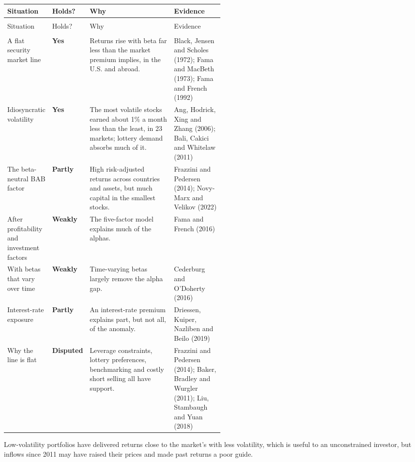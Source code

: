 {\small
\begin{longtable}{@{}>{\raggedright\arraybackslash}p{0.19\linewidth}>{\raggedright\arraybackslash}p{0.10\linewidth}>{\raggedright\arraybackslash}p{}>{\raggedright\arraybackslash}p{0.23\linewidth}@{}}
\toprule
Situation & Holds? & Why & Evidence \\
\midrule
\endfirsthead
\multicolumn{4}{@{}l}{\emph{(continued)}} \\
\toprule
Situation & Holds? & Why & Evidence \\
\midrule
\endhead
\midrule
\multicolumn{4}{r@{}}{\emph{(continued on the next page)}} \\
\endfoot
\bottomrule
\endlastfoot
A flat security market line & \textbf{Yes} & Returns rise with beta far less than the market premium implies, in the U.S. and abroad. & Black, Jensen and Scholes (1972); Fama and MacBeth (1973); Fama and French (1992) \\
\addlinespace[3pt]
Idiosyncratic volatility & \textbf{Yes} & The most volatile stocks earned about 1\% a month less than the least, in 23 markets; lottery demand absorbs much of it. & Ang, Hodrick, Xing and Zhang (2006); Bali, Cakici and Whitelaw (2011) \\
\addlinespace[3pt]
The beta-neutral BAB factor & \textbf{Partly} & High risk-adjusted returns across countries and assets, but much capital in the smallest stocks. & Frazzini and Pedersen (2014); Novy-Marx and Velikov (2022) \\
\addlinespace[3pt]
After profitability and investment factors & \textbf{Weakly} & The five-factor model explains much of the alphas. & Fama and French (2016) \\
\addlinespace[3pt]
With betas that vary over time & \textbf{Weakly} & Time-varying betas largely remove the alpha gap. & Cederburg and O'Doherty (2016) \\
\addlinespace[3pt]
Interest-rate exposure & \textbf{Partly} & An interest-rate premium explains part, but not all, of the anomaly. & Driessen, Kuiper, Nazliben and Beilo (2019) \\
\addlinespace[3pt]
Why the line is flat & \textbf{Disputed} & Leverage constraints, lottery preferences, benchmarking and costly short selling all have support. & Frazzini and Pedersen (2014); Baker, Bradley and Wurgler (2011); Liu, Stambaugh and Yuan (2018) \\
\end{longtable}
}

Low-volatility portfolios have delivered returns close to the market's with less volatility, which is useful to an unconstrained investor, but inflows since 2011 may have raised their prices and made past returns a poor guide.


